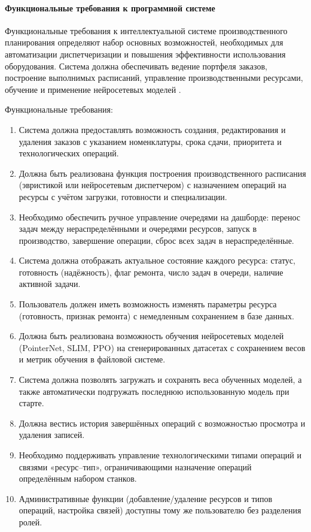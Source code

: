 \paragraph{Функциональные требования к программной системе}

Функциональные требования к интеллектуальной системе производственного планирования определяют набор основных возможностей, необходимых для автоматизации диспетчеризации и повышения эффективности использования оборудования. Система должна обеспечивать ведение портфеля заказов, построение выполнимых расписаний, управление производственными ресурсами, обучение и применение нейросетевых моделей \cite{cifradvoynik}.

Функциональные требования:
\begin{enumerate}
\item Система должна предоставлять возможность создания, редактирования и удаления заказов с указанием номенклатуры, срока сдачи, приоритета и технологических операций.
\item Должна быть реализована функция построения производственного расписания (эвристикой или нейросетевым диспетчером) с назначением операций на ресурсы с учётом загрузки, готовности и специализации.
\item Необходимо обеспечить ручное управление очередями на дашборде: перенос задач между нераспределёнными и очередями ресурсов, запуск в производство, завершение операции, сброс всех задач в нераспределённые.
\item Система должна отображать актуальное состояние каждого ресурса: статус, готовность (надёжность), флаг ремонта, число задач в очереди, наличие активной задачи.
\item Пользователь должен иметь возможность изменять параметры ресурса (готовность, признак ремонта) с немедленным сохранением в базе данных.
\item Должна быть реализована возможность обучения нейросетевых моделей (PointerNet, SLIM, PPO) на сгенерированных датасетах с сохранением весов и метрик обучения в файловой системе.
\item Система должна позволять загружать и сохранять веса обученных моделей, а также автоматически подгружать последнюю использованную модель при старте.
\item Должна вестись история завершённых операций с возможностью просмотра и удаления записей.
\item Необходимо поддерживать управление технологическими типами операций и связями «ресурс–тип», ограничивающими назначение операций определённым набором станков.
\item Административные функции (добавление/удаление ресурсов и типов операций, настройка связей) доступны тому же пользователю без разделения ролей.
\end{enumerate}

